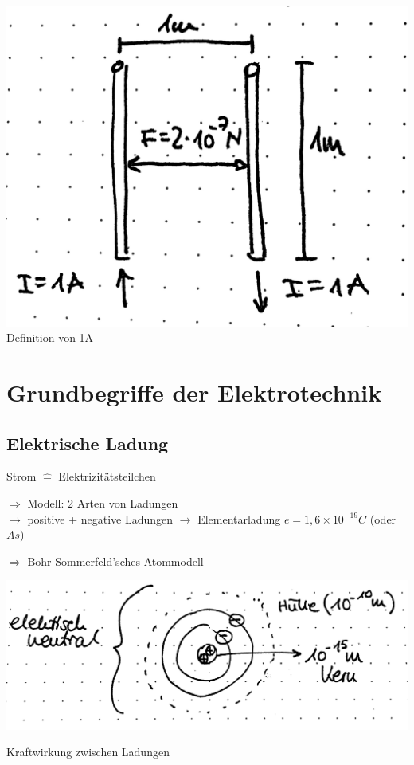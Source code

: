 \documentclass[10pt, a4paper]{article}
\newcommand{\ra}{$\rightarrow$ }
\newcommand{\Ra}{$\Rightarrow$ }
\begin{document}
\includegraphics[width=\textwidth]{img/3}
Definition von 1A

\section{Grundbegriffe der Elektrotechnik}
\subsection{Elektrische Ladung}

Strom $\hat{=}$ \glqq Elektrizitätsteilchen\grqq

\Ra Modell: 2 Arten von Ladungen\\
\ra positive + negative Ladungen \ra Elementarladung $e = 1,6 \times 10^{-19}C$ (oder $As$)

\Ra Bohr-Sommerfeld'sches Atommodell

\includegraphics[width=\textwidth]{img/4}

Kraftwirkung zwischen Ladungen
\end{document}
